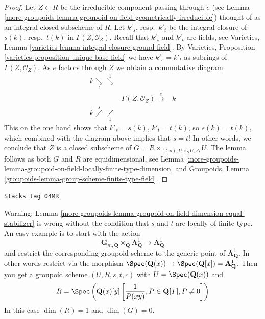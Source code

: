 \begin{proof}
Let $Z \subset R$ be the irreducible component passing through $e$ (see
Lemma \ref{more-groupoids-lemma-groupoid-on-field-geometrically-irreducible})
thought of as an integral closed subscheme of $R$.
Let $k'_s$, resp.\ $k'_t$ be the integral closure of
$s(k)$, resp.\ $t(k)$ in $\Gamma(Z, \mathcal{O}_Z)$.
Recall that $k'_s$ and $k'_t$ are fields, see
Varieties, Lemma \ref{varieties-lemma-integral-closure-ground-field}.
By
Varieties, Proposition \ref{varieties-proposition-unique-base-field}
we have $k'_s = k'_t$ as subrings of $\Gamma(Z, \mathcal{O}_Z)$.
As $e$ factors through $Z$ we obtain a commutative diagram
$$
\begin{array}{ccc}k \underset{t}{\searrow}\overset{1}{\searrow} &  &  \\  & \Gamma(Z, \mathcal{O}_Z) \overset{e}{\longrightarrow} & k \\ k \overset{s}{\nearrow}\underset{1}{\nearrow} &  & \end{array}
$$
This on the one hand shows that $k'_s = s(k)$, $k'_t = t(k)$, so
$s(k) = t(k)$, which combined with the diagram above implies
that $s = t$! In other words, we conclude that $Z$ is a closed
subscheme of $G = R \times_{(t, s), U \times_S U, \Delta} U$.
The lemma follows as both $G$ and $R$ are equidimensional, see
Lemma \ref{more-groupoids-lemma-groupoid-on-field-locally-finite-type-dimension} and
Groupoids, Lemma \ref{groupoids-lemma-group-scheme-finite-type-field}.
\end{proof}

\begin{remark}
\label{more-groupoids-remark-warn-dimension-groupoid-on-field}
\href{https://stacks.math.columbia.edu/tag/04MR}{\texttt{Stacks tag 04MR}}

Warning:
Lemma \ref{more-groupoids-lemma-groupoid-on-field-dimension-equal-stabilizer}
is wrong without the condition that $s$ and $t$ are locally of
finite type.
An easy example is to start with the action
$$
\mathbf{G}_{m, \mathbf{Q}} \times_{\mathbf{Q}} \mathbf{A}^1_{\mathbf{Q}}
\to \mathbf{A}^1_{\mathbf{Q}}
$$
and restrict the corresponding groupoid scheme to the generic point of
$\mathbf{A}^1_{\mathbf{Q}}$. In other words restrict via the morphism
$\Spec(\mathbf{Q}(x)) \to
\Spec(\mathbf{Q}[x]) = \mathbf{A}^1_{\mathbf{Q}}$.
Then you get a groupoid scheme
$(U, R, s, t, c)$ with
$U = \Spec(\mathbf{Q}(x))$
and
$$
R = \Spec\left(
\mathbf{Q}(x)[y]\left[
\frac{1}{P(xy)}, P \in \mathbf{Q}[T], P \not = 0
\right]
\right)
$$
In this case $\dim(R) = 1$ and $\dim(G) = 0$.
\end{remark}

